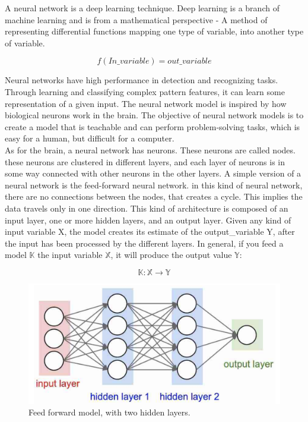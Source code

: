 A neural network is a deep learning technique. Deep learning is a branch of machine learning and is from a mathematical perspective - A method of representing differential functions mapping one type of variable, into another type of variable.

$$
f(In\_variable) = out\_variable
$$

\noindent
Neural networks have high performance in detection and recognizing tasks. Through learning and classifying complex pattern features, it can learn some representation of a given input. The neural network model is inspired by how biological neurons work in the brain. The objective of neural network models is to create a model that is teachable and can perform problem-solving tasks, which is easy for a human, but difficult for a computer.\\

\noindent
As for the brain, a neural network has neurons. These neurons are called nodes. these neurons are clustered in different layers, and each layer of neurons is in some way connected with other neurons in the other layers.  A simple version of a neural network is the feed-forward neural network. in this kind of neural network, there are no connections between the nodes, that creates a cycle. This implies the data travels only in one direction. This kind of architecture is composed of an input layer, one or more hidden layers, and an output layer. Given any kind of input variable X, the model creates its estimate of the output\_variable Y, after the input has been processed by the different layers.
In general, if you feed a model $\mathbb{K}$ the input variable $\mathbb{X}$, it will produce the output value $\mathbb{Y}:$

$$
\mathbb{K}: \mathbb{X} \to \mathbb{Y}
$$

\begin{figure}[!ht]
  \centering
  \includegraphics[scale=0.4]{latex/IMGs/NN.png}
  \caption{Feed forward model, with two hidden layers.}\label{Baseline:before}
\end{figure}

